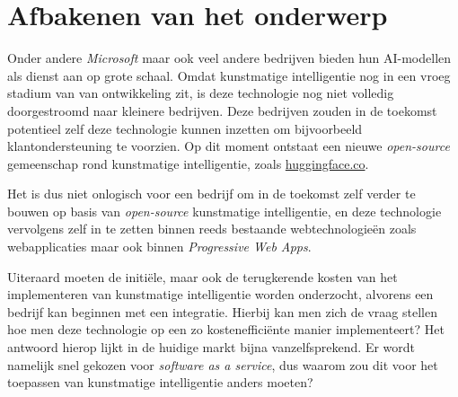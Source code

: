 \break{}

\section{Afbakenen van het onderwerp}

Onder andere \textit{Microsoft} maar ook veel andere bedrijven bieden hun AI-modellen als dienst aan op grote schaal. Omdat kunstmatige intelligentie nog in een vroeg stadium van van ontwikkeling zit, is deze technologie nog niet volledig doorgestroomd naar kleinere bedrijven. Deze bedrijven zouden in de toekomst potentieel zelf deze technologie kunnen inzetten om bijvoorbeeld klant\-on\-der\-steu\-ning te voorzien. Op dit moment ontstaat een nieuwe \textit{open-source} gemeenschap rond kunstmatige intelligentie, zoals \href{https://huggingface.co/}{huggingface.co}.

Het is dus niet onlogisch voor een bedrijf om in de toekomst zelf verder te bouwen op basis van \textit{open-source} kunstmatige intelligentie, en deze technologie vervolgens zelf in te zetten binnen reeds bestaande webtechnologieën zoals web\-app\-li\-ca\-ties maar ook binnen \textit{Progressive Web Apps}.

\bigbreak{}

Uiteraard moeten de initiële, maar ook de terugkerende kosten van het implementeren van kunstmatige intelligentie worden onderzocht, alvorens een bedrijf kan beginnen met een integratie. Hierbij kan men zich de vraag stellen hoe men deze technologie op een zo kostenefficiënte manier implementeert? Het antwoord hierop lijkt in de huidige markt bijna vanzelfsprekend. Er wordt namelijk snel gekozen voor \textit{software as a service}, dus waarom zou dit voor het toepassen van kunstmatige intelligentie anders moeten?

\section{}%
\label{sec:probleemstelling}


